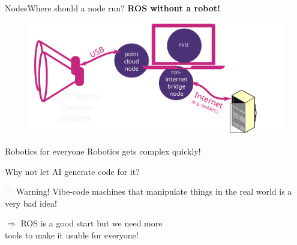 \documentclass[aspectratio=169]{beamer}
\begin{document}
  \begin{frame}[plain]{Nodes}{Where should a node run?}
    \textbf{ROS without a robot!}
      \begin{figure}[tbh!]
        \centering
        \includegraphics[width=.9\textwidth]{./figures/ros_nodes_example_3.pdf}
      \end{figure}

  \end{frame}



\begin{frame}{Robotics for everyone}
    \centering
      Robotics gets complex quickly!\\
      \pause
      
      \vspace{1em}
      Why not let AI generate code for it?
  
      \begin{minipage}{0.6\textwidth}
          \begin{alertblock}{\includegraphics[height=1em]{figures/hare_head_darkmode.pdf} Warning!}
              Vibe-code machines that manipulate things in the real world is a very bad idea!
          \end{alertblock}
  \end{minipage}

  \vspace{1em}
  $\Rightarrow$ ROS is a good start but we need more\\tools to make it usable for everyone!
\end{frame}
  
\end{document}
